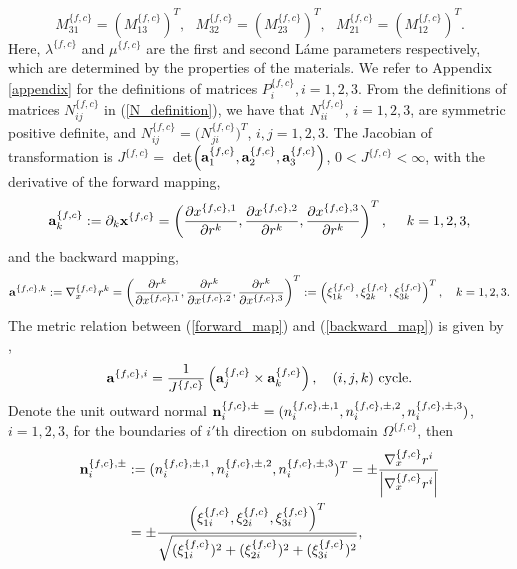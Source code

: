 \[ M_{31}^{\{f,c\}} = (M_{13}^{\{f,c\}})^T, \ \ \  M_{32}^{\{f,c\}} =(M_{23}^{\{f,c\}})^T, \ \ \ M_{21}^{\{f,c\}} =(M_{12}^{\{f,c\}})^T.\]
Here, $\lambda^{\{f,c\}}$ and $\mu^{\{f,c\}}$ are the first and second L{\' {a}}me parameters respectively, which are determined by the properties of the materials. We refer to Appendix \ref{appendix} for the definitions of matrices $P_i^{\{f,c\}}, i = 1,2,3$. From the definitions of matrices $N_{ij}^{\{f,c\}}$ in (\ref{N_definition}), we have that $N_{ii}^{\{f,c\}}$, $i = 1,2,3$, are symmetric positive definite, and $N_{ij}^{\{f,c\}}=\big(N_{ji}^{\{f,c\}}\big)^T$, $i,j=1,2,3$. The Jacobian of transformation is $J^{\{f,c\}} =$ det$\left({\bf a}^{\{f,c\}}_1,{\bf a}^{\{f,c\}}_2,{\bf a}^{\{f,c\}}_3\right)$, $0<J^{\{f,c\}}<\infty$, with the derivative of the forward mapping, 
\begin{equation}\label{forward_map}
{\bf a}_k^{\{f,c\}} := \partial_k{\bf x}^{\{f,c\}}  = \left(\frac{\partial x^{\{f,c\},1}}{\partial r^{k}},\frac{\partial x^{\{f,c\},2}}{\partial r^{k}},\frac{\partial x^{\{f,c\},3}}{\partial r^{k}}\right)^T,\ \ \ \ k = 1,2,3,
\end{equation}
and the backward mapping,
\begin{equation}\label{backward_map}
{\bf a}^{\{f,c\},k} := \nabla_x^{\{f,c\}} r^{k} = \left(\frac{\partial r^{k}}{\partial x^{\{f,c\},1}},\frac{\partial r^{k}}{\partial x^{\{f,c\},2}},\frac{\partial r^{k}}{\partial x^{\{f,c\},3}}\right)^T := \left(\xi_{1k}^{\{f,c\}},\xi_{2k}^{\{f,c\}},\xi_{3k}^{\{f,c\}}\right)^T,\ \ \ k = 1,2,3.
\end{equation}
 The metric relation between (\ref{forward_map}) and (\ref{backward_map}) is given by \cite{thompson1985numerical},
\begin{equation*}
{\bf a}^{\{f,c\},i} = \frac{1}{J^{\{f,c\}}}\left({\bf a}_j^{\{f,c\}}\times{\bf a}_k^{\{f,c\}}\right), \ \ \ (i,j,k) \ \mbox{cycle}.
\end{equation*}
Denote the unit outward normal ${\bf n}_i^{\{f,c\},\pm} = (n_i^{\{f,c\},\pm,1},n_i^{\{f,c\},\pm,2},n_i^{\{f,c\},\pm,3})$, $i = 1,2,3$, for the boundaries of $i'$th direction on subdomain $\Omega^{\{f,c\}}$, then
\begin{align}\label{outward_normal}
{\bf n}_i^{\{f,c\},\pm} &:= (n^{\{f,c\},\pm,1}_i,n^{\{f,c\},\pm,2}_i,n^{\{f,c\},\pm,3}_i)^T = \pm \frac{\nabla_x^{\{f,c\}} r^{i}}{\left|\nabla_x^{\{f,c\}} r^{i}\right|} \nonumber\\
&= \pm\frac{ \left(\xi_{1i}^{\{f,c\}},\xi_{2i}^{\{f,c\}},\xi_{3i}^{\{f,c\}}\right)^T}{\sqrt{(\xi_{1i}^{\{f,c\}})^2+(\xi_{2i}^{\{f,c\}})^2+(\xi_{3i}^{\{f,c\}})^2}},
\end{align}
